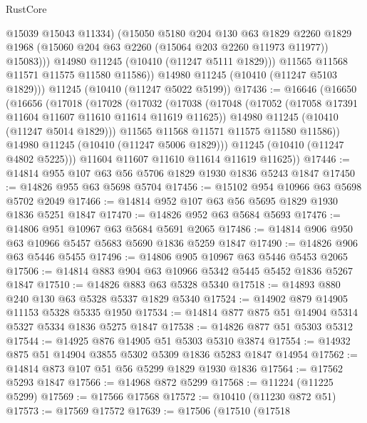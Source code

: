 \begin{lexlean}{RustCore}
\begin{coremodule}
                  @15039
                  @15043
                  @11334)
                (@15050
                  @5180
                  @204
                  @130
                  @63
                  @1829
                  @2260
                  @1829
                  @1968
                  (@15060 @204 @63 @2260 (@15064 @203 @2260 @11973 @11977))
                  @15083)))
            @14980
            @11245
            (@10410 (@11247 @5111 @1829)))
          @11565
          @11568
          @11571
          @11575
          @11580
          @11586))
      @14980
      @11245
      (@10410 (@11247 @5103 @1829)))
    @11245
    (@10410 (@11247 @5022 @5199))
@17436 := @16646
    (@16650
      (@16656
        (@17018
          (@17028
            (@17032
              (@17038
                (@17048
                  (@17052 (@17058 @17391 @11604 @11607 @11610 @11614 @11619 @11625))
                  @14980
                  @11245
                  (@10410 (@11247 @5014 @1829)))
                @11565
                @11568
                @11571
                @11575
                @11580
                @11586))
            @14980
            @11245
            (@10410 (@11247 @5006 @1829)))
          @11245
          (@10410 (@11247 @4802 @5225)))
        @11604
        @11607
        @11610
        @11614
        @11619
        @11625))
@17446 := @14814 @955 @107 @63 @56 @5706 @1829 @1930 @1836 @5243 @1847
@17450 := @14826 @955 @63 @5698 @5704
@17456 := @15102 @954 @10966 @63 @5698 @5702 @2049
@17466 := @14814 @952 @107 @63 @56 @5695 @1829 @1930 @1836 @5251 @1847
@17470 := @14826 @952 @63 @5684 @5693
@17476 := @14806 @951 @10967 @63 @5684 @5691 @2065
@17486 := @14814 @906 @950 @63 @10966 @5457 @5683 @5690 @1836 @5259 @1847
@17490 := @14826 @906 @63 @5446 @5455
@17496 := @14806 @905 @10967 @63 @5446 @5453 @2065
@17506 := @14814 @883 @904 @63 @10966 @5342 @5445 @5452 @1836 @5267 @1847
@17510 := @14826 @883 @63 @5328 @5340
@17518 := @14893 @880 @240 @130 @63 @5328 @5337 @1829 @5340
@17524 := @14902 @879 @14905 @11153 @5328 @5335 @1950
@17534 := @14814 @877 @875 @51 @14904 @5314 @5327 @5334 @1836 @5275 @1847
@17538 := @14826 @877 @51 @5303 @5312
@17544 := @14925 @876 @14905 @51 @5303 @5310 @3874
@17554 := @14932 @875 @51 @14904 @3855 @5302 @5309 @1836 @5283 @1847 @14954
@17562 := @14814 @873 @107 @51 @56 @5299 @1829 @1930 @1836
@17564 := @17562 @5293 @1847
@17566 := @14968 @872 @5299
@17568 := @11224 (@11225 @5299)
@17569 := @17566 @17568
@17572 := @10410 (@11230 @872 @51)
@17573 := @17569 @17572
@17639 := @17506
    (@17510
      (@17518

\end{coremodule}
\end{lexlean}
